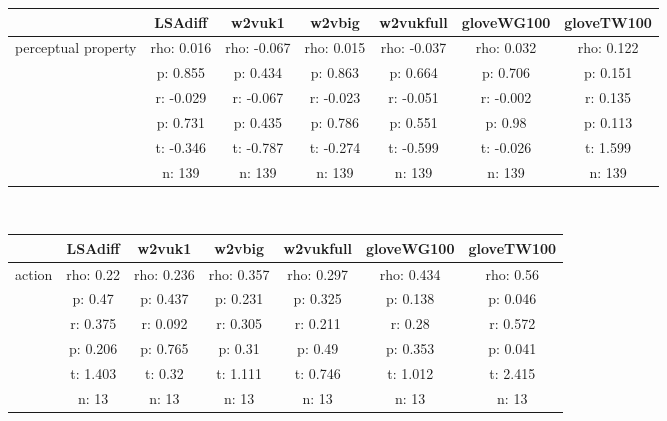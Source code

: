 \documentclass{article}
\begin{document}
\begin{tabular}{ccccccc|}\cline{2-7}
&\multicolumn{1}{|c}{LSAdiff} & w2vuk1 & w2vbig & w2vukfull & gloveWG100 & gloveTW100 \\\hline
\multicolumn{1}{|c|}{\multirow{6}{*}{perceptual property}} & rho: 0.016 & rho: -0.067 & rho: 0.015 & rho: -0.037 & rho: 0.032 & rho: 0.122 \\
\multicolumn{1}{|c|}{} & p: 0.855 & p: 0.434 & p: 0.863 & p: 0.664 & p: 0.706 & p: 0.151 \\
\multicolumn{1}{|c|}{} & r: -0.029 & r: -0.067 & r: -0.023 & r: -0.051 & r: -0.002 & r: 0.135 \\
\multicolumn{1}{|c|}{} & p: 0.731 & p: 0.435 & p: 0.786 & p: 0.551 & p: 0.98 & p: 0.113 \\
\multicolumn{1}{|c|}{} & t: -0.346 & t: -0.787 & t: -0.274 & t: -0.599 & t: -0.026 & t: 1.599 \\
\multicolumn{1}{|c|}{} & n: 139 & n: 139 & n: 139 & n: 139 & n: 139 & n: 139 \\
\hline
\end{tabular}\\
\begin{tabular}{ccccccc|}\cline{2-7}
&\multicolumn{1}{|c}{LSAdiff} & w2vuk1 & w2vbig & w2vukfull & gloveWG100 & gloveTW100 \\\hline
\multicolumn{1}{|c|}{\multirow{6}{*}{action}} & rho: 0.22 & rho: 0.236 & rho: 0.357 & rho: 0.297 & rho: 0.434 & rho: 0.56 \\
\multicolumn{1}{|c|}{} & p: 0.47 & p: 0.437 & p: 0.231 & p: 0.325 & p: 0.138 & p: 0.046 \\
\multicolumn{1}{|c|}{} & r: 0.375 & r: 0.092 & r: 0.305 & r: 0.211 & r: 0.28 & r: 0.572 \\
\multicolumn{1}{|c|}{} & p: 0.206 & p: 0.765 & p: 0.31 & p: 0.49 & p: 0.353 & p: 0.041 \\
\multicolumn{1}{|c|}{} & t: 1.403 & t: 0.32 & t: 1.111 & t: 0.746 & t: 1.012 & t: 2.415 \\
\multicolumn{1}{|c|}{} & n: 13 & n: 13 & n: 13 & n: 13 & n: 13 & n: 13 \\
\hline
\end{tabular}\\
\end{document}
